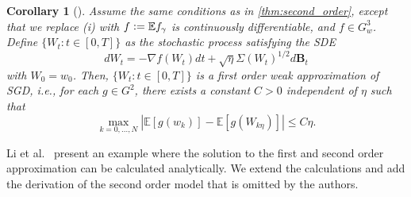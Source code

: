 \documentclass[12pt]{article}
\newtheorem{lemma}[lemma]{Lemma}
\newtheorem{corollary}[theorem]{Corollary}
\theoremstyle{definition}
\numberwithin{equation}{section}
\newcommand{\R}{\mathbb{R}}
\newcommand{\E}{\mathbb{E}}
\newcommand{\T}{\mathsf{T}}
\newcommand{\ev}[1]{\mathbb{E}\left[{#1}\right]}
\newcommand{\defeq}{\vcentcolon=}
\DeclareMathOperator{\diag}{diag}
\begin{document}
\begin{corollary}[]
  \label{cor:first_order}
  Assume the same conditions as in \autoref{thm:second_order}, except that we replace (i) with $f \defeq \E f_{\gamma}$ is continuously differentiable, and $f \in G^3_w$.
  Define $\{W_t:t\in [0,T] \}$ as the stochastic process satisfying the SDE
  \begin{equation}
    \label{eq:first_order_sde}
    d W_t = -\nabla f(W_t) dt + \sqrt{\eta}\Sigma(W_t)^{1/2}d\mathbf{B}_t
  \end{equation}
  with $W_0 = w_0$. Then, $\{W_t:t\in [0,T] \}$ is a first order weak approximation of SGD, i.e., for each $g \in G^2$, there exists a constant $C > 0$ independent of $\eta$ such that
  \begin{equation}
    \label{eq:first_order_convergence}
    \max_{k=0,\dots,N} |\ev{g(w_k)} - \ev{g(W_{k\eta})}| \leq C \eta.
  \end{equation}
\end{corollary}
Li et al.\ \cite{liStochasticModifiedEquations2019} present an example where the solution to the first and second order approximation can be calculated analytically. We extend the calculations and add the derivation of the second order model that is omitted by the authors.
  
\end{document}

